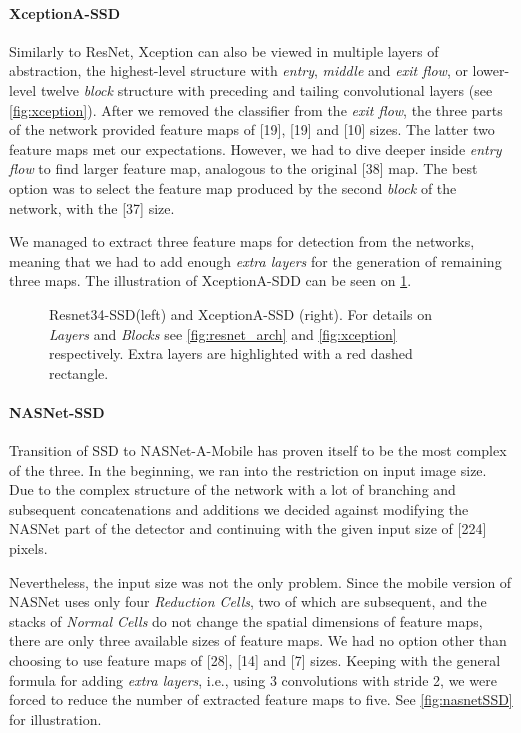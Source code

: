\paragraph{XceptionA-SSD} Similarly to ResNet, Xception can also be viewed in multiple layers of abstraction, the highest-level structure with \textit{entry}, \textit{middle} and \textit{exit flow}, or lower-level twelve \textit{block} structure with preceding and tailing convolutional layers (see \cref{fig:xception}). After we removed the classifier from the \textit{exit flow}, the three parts of the network provided feature maps of [19], [19] and [10] sizes. The latter two feature maps met our expectations. However, we had to dive deeper inside \textit{entry flow} to find larger feature map, analogous to the original [38] map. The best option was to select the feature map produced by the second \textit{block} of the network, with the [37] size. 

We managed to extract three feature maps for detection from the networks, meaning that we had to add enough \textit{extra layers} for the generation of remaining three maps. The illustration of XceptionA-SDD can be seen on \cref{fig:resnet_xception_SSD}.


\begin{figure}
    \centering
    \resnetSSD
    \caption[Resnet34-SSD and XceptionA-SSD]%
    {Resnet34-SSD(left) and XceptionA-SSD (right). For details on \textit{Layers} and \textit{Blocks} see \cref{fig:resnet_arch} and \cref{fig:xception} respectively. Extra layers are highlighted with a red dashed rectangle.}

    \label{fig:resnet_xception_SSD}
\end{figure}

\paragraph{NASNet-SSD} Transition of SSD to NASNet-A-Mobile has proven itself to be the most complex of the three. In the beginning, we ran into the restriction on input image size. Due to the complex structure of the network with a lot of branching and subsequent concatenations and additions we decided against modifying the NASNet part of the detector and continuing with the given input size of [224] pixels.

Nevertheless, the input size was not the only problem. Since the mobile version of NASNet uses only four \textit{Reduction Cells}, two of which are subsequent, and the stacks of \textit{Normal Cells} do not change the spatial dimensions of feature maps, there are only three available sizes of feature maps. We had no option other than choosing to use feature maps of [28], [14] and [7] sizes. Keeping with the general formula for adding \textit{extra layers}, i.e., using 3 convolutions with stride 2, we were forced to reduce the number of extracted feature maps to five. See \cref{fig:nasnetSSD} for illustration.

